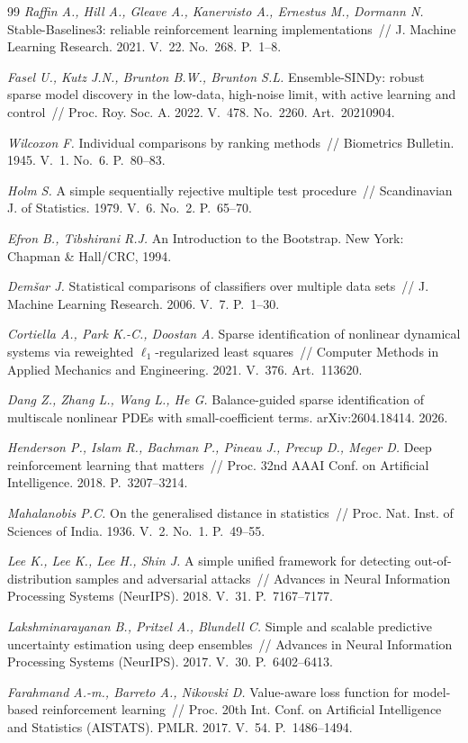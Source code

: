 \documentclass[12pt,a4paper,leqno]{article}
\begin{document}
\begin{thebibliography}{99}
\textit{Raffin A., Hill A., Gleave A., Kanervisto A., Ernestus M., Dormann N.}
Stable-Baselines3: reliable reinforcement learning implementations~// J. Machine Learning
Research. 2021. V.~22. No.~268. P.~1--8.

\textit{Fasel U., Kutz J.N., Brunton B.W., Brunton S.L.} Ensemble-SINDy: robust sparse
model discovery in the low-data, high-noise limit, with active learning and control~//
Proc. Roy. Soc. A. 2022. V.~478. No.~2260. Art.~20210904.

\textit{Wilcoxon F.} Individual comparisons by ranking methods~// Biometrics Bulletin.
1945. V.~1. No.~6. P.~80--83.

\textit{Holm S.} A simple sequentially rejective multiple test procedure~// Scandinavian
J. of Statistics. 1979. V.~6. No.~2. P.~65--70.

\textit{Efron B., Tibshirani R.J.} An Introduction to the Bootstrap. New York: Chapman
\& Hall/CRC, 1994.

\textit{Dem\v{s}ar J.} Statistical comparisons of classifiers over multiple data sets~//
J. Machine Learning Research. 2006. V.~7. P.~1--30.

\textit{Cortiella A., Park K.-C., Doostan A.} Sparse identification of nonlinear
dynamical systems via reweighted $\ell_1$-regularized least squares~// Computer Methods
in Applied Mechanics and Engineering. 2021. V.~376. Art.~113620.

\textit{Dang Z., Zhang L., Wang L., He G.} Balance-guided sparse identification of
multiscale nonlinear PDEs with small-coefficient terms. arXiv:2604.18414. 2026.

\textit{Henderson P., Islam R., Bachman P., Pineau J., Precup D., Meger D.} Deep
reinforcement learning that matters~// Proc. 32nd AAAI Conf. on Artificial Intelligence.
2018. P.~3207--3214.

\textit{Mahalanobis P.C.} On the generalised distance in statistics~// Proc. Nat. Inst.
of Sciences of India. 1936. V.~2. No.~1. P.~49--55.

\textit{Lee K., Lee K., Lee H., Shin J.} A simple unified framework for detecting
out-of-distribution samples and adversarial attacks~// Advances in Neural Information
Processing Systems (NeurIPS). 2018. V.~31. P.~7167--7177.

\textit{Lakshminarayanan B., Pritzel A., Blundell C.} Simple and scalable predictive
uncertainty estimation using deep ensembles~// Advances in Neural Information Processing
Systems (NeurIPS). 2017. V.~30. P.~6402--6413.

\textit{Farahmand A.-m., Barreto A., Nikovski D.} Value-aware loss function for
model-based reinforcement learning~// Proc. 20th Int. Conf. on Artificial Intelligence
and Statistics (AISTATS). PMLR. 2017. V.~54. P.~1486--1494.

\end{thebibliography}
\end{document}
